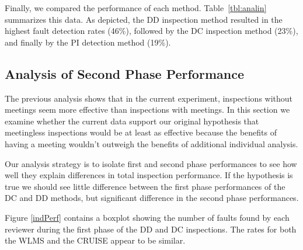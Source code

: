Finally, we compared the performance of each method. 
Table~\ref{tbl:analin} summarizes this data.  As depicted, 
the {DD} inspection method resulted in the
highest fault detection rates (46\%), followed by the {DC}
inspection method (23\%), and finally by the PI detection method (19\%).



\subsection{Analysis of Second Phase Performance}

The previous analysis shows that in the current experiment, inspections
without meetings seem more effective than inspections with meetings.
In this section we examine whether the current data support 
our original hypothesis that meetingless inspections would
be at least as effective because the benefits of having a meeting wouldn't
outweigh the benefits of additional individual analysis. 

Our analysis strategy is to isolate first and second phase 
performances to see how well they explain differences in total inspection
performance. If the hypothesis is true we should see little difference
between the first phase performances of the DC and DD methods, but 
significant difference in the second phase performances.

%


Figure \ref{indPerf} contains a boxplot showing the
number of faults found by each reviewer during the 
first phase of the DD and DC inspections. The rates 
for both the WLMS and the CRUISE appear to be similar.

